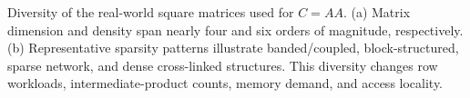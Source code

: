 \caption{Diversity of the real-world square matrices used for $C=AA$. (a) Matrix dimension and density span nearly four and six orders of magnitude, respectively. (b) Representative sparsity patterns illustrate banded/coupled, block-structured, sparse network, and dense cross-linked structures. This diversity changes row workloads, intermediate-product counts, memory demand, and access locality.}
\label{fig:matrix-diversity}
